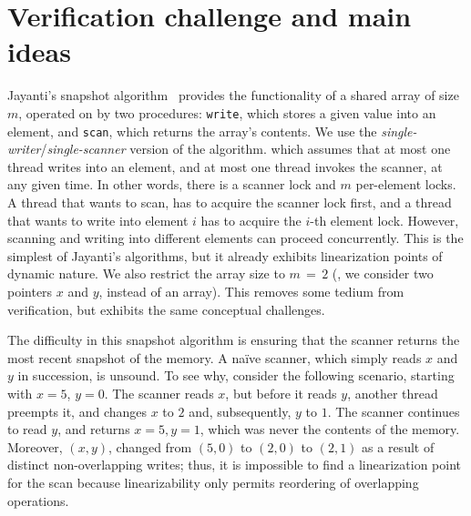 


\newcommand{\fx}{\mathit{fx}}
\newcommand{\fy}{\mathit{fy}}
\newcommand{\x}{x}
\newcommand{\y}{y}
\newcommand{\s}{S}



\newcommand{\jywrite}{\texttt{write}\xspace}
\newcommand{\jyscan}{\texttt{scan}\xspace}

\section{Verification challenge and main ideas}
\label{sc:overview}


Jayanti's snapshot algorithm~\cite{Jayanti+STOC05} provides the
functionality of a shared array of size $m$, operated on by two
procedures: \jywrite, which stores a given value into an element, and
\jyscan, which returns the array's contents. We use the
\emph{single-writer}/\emph{single-scanner} version of the algorithm.
which assumes that at most one thread writes into an element, and at
most one thread invokes the scanner, at any given time. In other
words, there is a scanner lock and $m$ per-element locks. A thread
that wants to scan, has to acquire the scanner lock first, and a
thread that wants to write into element $i$ has to acquire the $i$-th
element lock. However, scanning and writing into different elements
can proceed concurrently.
% 
This is the simplest of Jayanti's algorithms, but it already exhibits
linearization points of dynamic nature. We also restrict the array
size to $m\,{=}\,2$ (\ie, we consider two pointers $\x$ and $\y$,
instead of an array). This removes some tedium from verification, but
exhibits the same conceptual challenges.
 
The difficulty in this snapshot algorithm is ensuring that the scanner
returns the most recent snapshot of the memory. A na\"{i}ve scanner, which
simply reads $\x$ and $\y$ in succession, is unsound. To see why,
consider the following scenario, starting with $\x=5$, $\y=0$. The
scanner reads $\x$, but before it reads $\y$, another thread preempts
it, and changes $\x$ to $2$ and, subsequently, $\y$ to $1$. The
scanner continues to read $\y$, and returns $\x=5, \y=1$, which was
never the contents of the memory. Moreover, $(\x, \y)$, changed from
$(5,0)$ to $(2, 0)$ to $(2, 1)$ as a result of distinct
non-overlapping writes; thus, it is impossible to find a linearization
point for the scan because linearizability only permits reordering of
overlapping operations.

